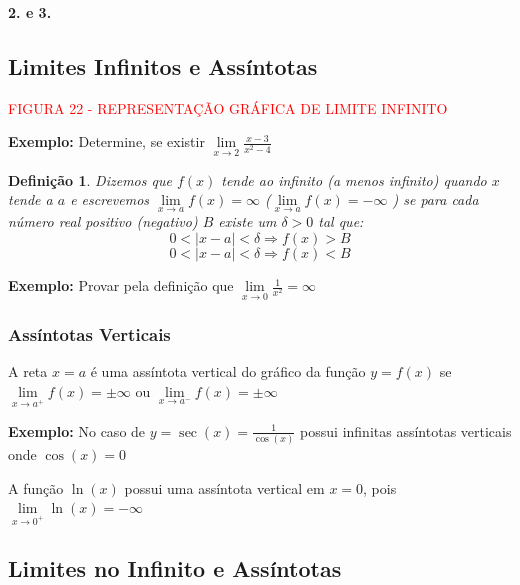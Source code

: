 \documentclass[oneside,a4paper,12pt]{article}
\newtheorem{definition}{Definição}[section]
\begin{document}
{\bf 2. e 3.}
\newpage

\subsection{Limites Infinitos e Assíntotas}

\vspace{250pt}
\begin{center}
	\textcolor{red}{FIGURA 22 - REPRESENTAÇÃO GRÁFICA DE LIMITE INFINITO}
\end{center}

{\bf Exemplo: } Determine, se existir $\lim\limits_{x \rightarrow 2}\frac{x-3}{x^2-4}$


\vspace{200pt}

\begin{definition}
	Dizemos que $f(x)$ tende ao infinito \emph{ (a menos infinito)} quando $x$ tende a $a$ e escrevemos $\lim\limits_{x \rightarrow a}f(x) = \infty$ \emph{($\lim\limits_{x \rightarrow a}f(x) = - \infty$ )} se para cada número real positivo \emph{(negativo)} $B$ existe um $\delta > 0$ tal que:
	$$0<|x-a|<\delta \Rightarrow f(x) >B $$
	$$0<|x-a|<\delta \Rightarrow f(x) <B $$	
\end{definition}

{\bf Exemplo: } Provar pela definição que $\lim\limits_{x \rightarrow 0}\frac{1}{x^2}=\infty$

\vspace{300pt}

\subsubsection{Assíntotas Verticais}
A reta $x = a$ é uma assíntota vertical do gráfico da função $y = f(x)$ se $\lim\limits_{x \rightarrow a^{+}}f(x) = \pm \infty$ ou $\lim\limits_{x \rightarrow a^{-}}f(x) = \pm \infty$

{\bf Exemplo: } No caso de $y = \sec(x) = \frac{1}{\cos(x)}$ possui infinitas assíntotas verticais onde $\cos(x) = 0$

\vspace{300pt}

A função $\ln(x)$ possui uma assíntota vertical em $x=0$, pois $\lim\limits_{x \rightarrow 0^{+}}\ln(x)= - \infty$

\subsection{Limites no Infinito e Assíntotas}
\end{document}
